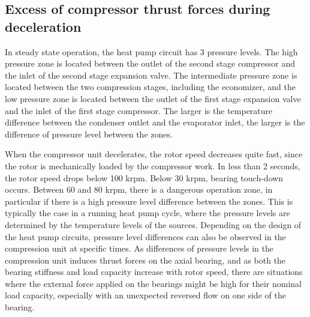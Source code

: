 \subsection{Excess of compressor thrust forces during
  deceleration}
\label{sec:awp-P-balance}

In steady state operation, the heat pump circuit has 3 pressure
levels. The high pressure zone is located between the outlet of
the second stage compressor and the inlet of the second stage
expansion valve. The intermediate pressure zone is located between the
two compression stages, including the economizer, and the low pressure
zone is located between the outlet of the first stage expansion valve
and the inlet of the first stage compressor. The larger is the
temperature difference between the condenser outlet and the evaporator
inlet, the larger is the difference of pressure level between the
zones.

When the compressor unit decelerates, the rotor speed decreases quite
fast, since the rotor is mechanically loaded by the compressor
work. In less than 2 seconds, the rotor speed drops below 100
krpm. Below 30 krpm, bearing touch-down occurs. Between 60 and 80
krpm, there is a dangerous operation zone, in particular if there is a
high pressure level difference between the zones. This
is typically the case in a running heat pump cycle, where the pressure
levels are determined by the temperature levels of the
sources. Depending on the design of the heat pump circuits, pressure
level differences can also be observed in the compression unit at
specific times. As differences of pressure levels in the compression
unit induces thrust forces on the axial bearing, and as both the
bearing stiffness and load capacity increase with rotor speed, there
are situations where the external force applied on the bearings might
be high for their nominal load capacity, especially with an unexpected
reversed flow on one side of the bearing.

